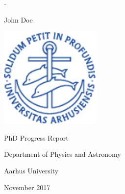 

\AtBeginShipoutNext{\AtBeginShipoutNext{\AtBeginShipoutDiscard}}

\begin{titlingpage}
  \newlength{\frontpagecorrection}
  \calccentering{\frontpagecorrection}
  \begin{adjustwidth*}{\frontpagecorrection-2cm}{-\frontpagecorrection-2cm}

    \centering
    \sffamily

    \vspace*{0.1cm}

    \fontsize{26pt}{29pt}\selectfont

    \projecttitle \par

    \vspace{0.8cm}

    \fontsize{18pt}{22pt}\selectfont

    John Doe \par

    \vspace{2.7cm}

    \includegraphics[width=5cm]{front/segla1b}

    \vspace{2.7cm}

    PhD Progress Report

    \vspace{1.0cm}

    \fontsize{14pt}{17pt}\selectfont

    Department of Physics and Astronomy\par
    Aarhus University\par

    \vspace{0.3cm}

    November 2017

  \end{adjustwidth*}
\end{titlingpage}


